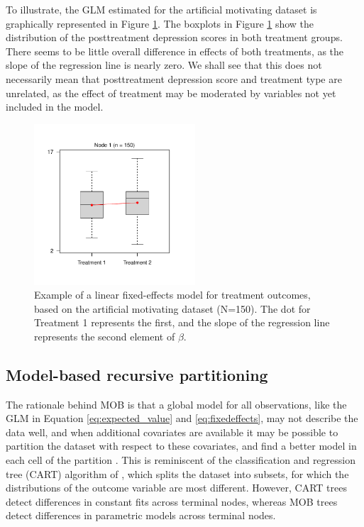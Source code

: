 \documentclass[nobf,doc]{apa}
\begin{document}
To illustrate, the GLM estimated for the artificial motivating dataset is graphically represented in Figure \ref{fig:fixedeffects}. The boxplots in Figure \ref{fig:fixedeffects} show the distribution of the posttreatment depression scores in both treatment groups. There seems to be little overall difference in effects of both treatments, as the slope of the regression line is nearly zero. We shall see that this does not necessarily mean that posttreatment depression score and treatment type are unrelated, as the effect of treatment may be moderated by variables not yet included in the model.

\vspace{20pt}
\begin{figure}[!htbp]
    \includegraphics[width=6cm]{glm_example.pdf}
	\caption{Example of a linear fixed-effects model for treatment outcomes, based on the artificial motivating dataset (N=150). The dot for Treatment 1 represents the first, and the slope of the regression line represents the second element of $\beta$.}
	\label{fig:fixedeffects}
\end{figure}


\subsection{Model-based recursive partitioning}

The rationale behind MOB is that a global model for all observations, like the GLM in Equation \ref{eq:expected_value} and \ref{eq:fixedeffects}, may not describe the data well, and when additional covariates are available it may be possible to partition the dataset with respect to these covariates, and find a better model in each cell of the partition \cite{ZeilyHoth08}. This is reminiscent of the classification and regression tree (CART) algorithm of , which splits the dataset into subsets, for which the distributions of the outcome variable are most different. However, CART trees detect differences in constant fits across terminal nodes, whereas MOB trees detect differences in parametric models across terminal nodes.
\end{document}
